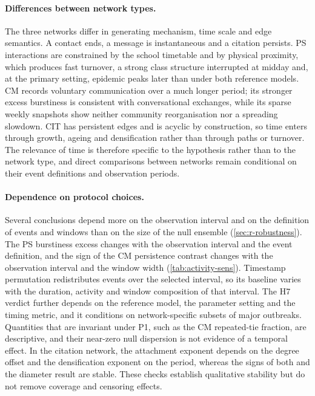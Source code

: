 \paragraph{Differences between network types.}
The three networks differ in generating mechanism, time scale and edge semantics. A contact
ends, a message is instantaneous and a citation persists. PS interactions are constrained by
the school timetable and by physical proximity, which produces fast turnover, a strong class
structure interrupted at midday and, at the primary setting, epidemic peaks later than under
both reference models. CM records voluntary communication over a much longer period; its
stronger excess burstiness is consistent with conversational exchanges, while its sparse
weekly snapshots show neither community reorganisation nor a spreading slowdown. CIT has
persistent edges and is acyclic by construction, so time enters through growth, ageing and
densification rather than through paths or turnover. The relevance of time is therefore
specific to the hypothesis rather than to the network type, and direct comparisons between
networks remain conditional on their event definitions and observation periods.

\paragraph{Dependence on protocol choices.}
Several conclusions depend more on the observation interval and on the definition of events
and windows than on the size of the null ensemble (\cref{sec:r-robustness}). The PS
burstiness excess changes with the observation interval and the event definition, and the
sign of the CM persistence contrast changes with the observation interval and the window
width (\cref{tab:activity-sens}). Timestamp permutation redistributes events over the
selected interval, so its baseline varies with the duration, activity and window composition
of that interval. The H7 verdict further depends on the reference model, the parameter
setting and the timing metric, and it conditions on network-specific subsets of major
outbreaks. Quantities that are invariant under P1, such as the CM repeated-tie fraction, are
descriptive, and their near-zero null dispersion is not evidence of a temporal effect. In the
citation network, the attachment exponent depends on the degree offset and the
densification exponent on the period, whereas the signs of both and the diameter result are
stable. These checks establish qualitative stability but do not remove coverage and
censoring effects.

